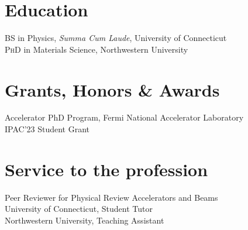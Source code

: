 \documentclass[11pt]{article} %
\begin{document}

\section*{Education}

\textsc{BS} in Physics, \emph{Summa Cum Laude}, University of Connecticut\\
\textsc{PhD} in Materials Science, Northwestern University


\section*{Grants, Honors \& Awards}

Accelerator PhD Program, Fermi National Accelerator Laboratory\\
IPAC'23 Student Grant





\section*{Service to the profession}

Peer Reviewer for Physical Review Accelerators and Beams\\
 University of Connecticut, Student Tutor\\
 Northwestern University, Teaching Assistant

\vfill %



\end{document}
